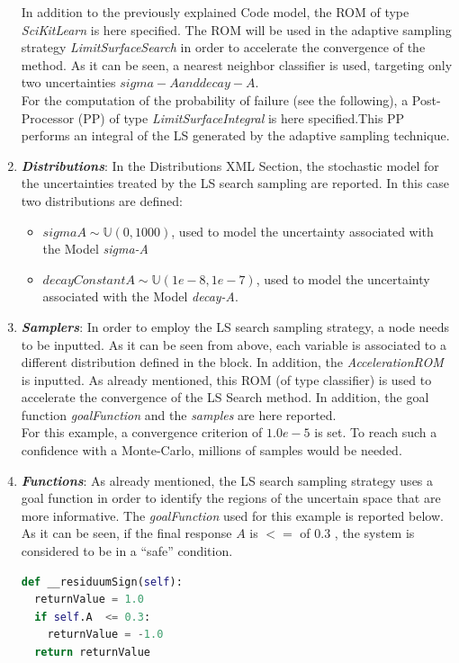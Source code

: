 \begin{enumerate}
 In addition to the previously explained Code
 model,
 the ROM of type \textit{SciKitLearn} is here specified. The ROM will be
 used in the adaptive sampling strategy \textit{LimitSurfaceSearch} in
 order to accelerate the convergence of the method. As it can be seen,
 a nearest neighbor classifier is used, targeting only two uncertainties
 $sigma-A and decay-A$.
 \\ For the computation of the probability of failure (see the following), a
 Post-Processor (PP) of type \textit{LimitSurfaceIntegral} is here
 specified.This PP performs an integral of the LS
 generated by the adaptive sampling technique.
   \item \textbf{\textit{Distributions}}:
  In the Distributions XML Section, the stochastic model for the
  uncertainties  treated by the LS search sampling are reported. In
  this case two distributions are defined:
  \begin{itemize}
    \item $sigmaA \sim \mathbb{U}(0,1000)$, used to model the uncertainty
    associated with  the Model \textit{sigma-A}
    \item  $decayConstantA \sim \mathbb{U}(1e-8,1e-7)$,  used to
    model the uncertainty
    associated with  the Model \textit{decay-A}.
  \end{itemize}
   \item \textbf{\textit{Samplers}}:
  In order to employ the LS search sampling strategy, a
   node needs to be inputted.
  As it can be
  seen from above, each variable is associated to a different distribution
  defined in the   block.
  In addition, the \textit{AccelerationROM}   is inputted.
  As already mentioned, this ROM (of type classifier) is used to
  accelerate the convergence of the LS Search method.
  In addition, the goal function \textit{goalFunction}  and the
  \textit{samples} are here reported.
  \\For this example, a convergence criterion of $1.0e-5$ is set. To reach such a confidence with a Monte-Carlo, millions of
  samples would be needed.
   \item \textbf{\textit{Functions}}:
 As already mentioned, the LS search sampling strategy uses
 a goal function in order to identify the regions of the uncertain space
 that are more informative. The \textit{goalFunction} used for this
 example is reported below. As it can be seen, if the final response $A$
 is $<=$ of $0.3$ , the system is considered to be in a ``safe'' condition.
\begin{lstlisting}[language=python]
def __residuumSign(self):
  returnValue = 1.0
  if self.A  <= 0.3:
    returnValue = -1.0
  return returnValue
\end{lstlisting}


\end{enumerate}
